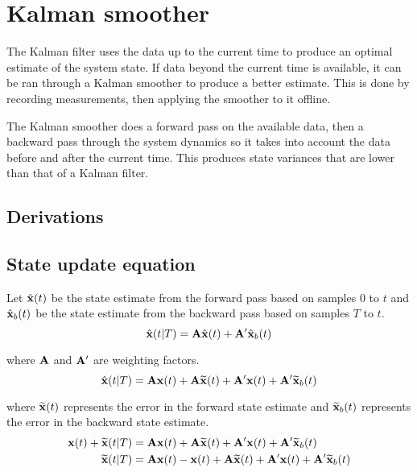 \section{Kalman smoother}

The Kalman filter uses the data up to the current time to produce an optimal
estimate of the system \gls{state}. If data beyond the current time is
available, it can be ran through a Kalman smoother to produce a better estimate.
This is done by recording measurements, then applying the smoother to it
offline.

The Kalman smoother does a forward pass on the available data, then a backward
pass through the system dynamics so it takes into account the data before and
after the current time. This produces \gls{state} variances that are lower than
that of a Kalman filter.

\subsection{Derivations}

\subsection{State update equation}

Let $\hat{\mathbf{x}}(t)$ be the state estimate from the forward pass based on
samples $0$ to $t$ and $\hat{\mathbf{x}}_b(t)$ be the state estimate from the
backward pass based on samples $T$ to $t$.
\begin{equation}
  \hat{\mathbf{x}}(t|T) = \mathbf{A}\hat{\mathbf{x}}(t) + \mathbf{A}'\hat{\mathbf{x}}_b(t)
    \label{eq:ks_xhat}
\end{equation}

where $\mathbf{A}$ and $\mathbf{A}'$ are weighting factors.
\begin{equation*}
  \hat{\mathbf{x}}(t|T) = \mathbf{A}\mathbf{x}(t) + \mathbf{A}\widetilde{\mathbf{x}}(t) +
    \mathbf{A}'\mathbf{x}(t) + \mathbf{A}'\widetilde{\mathbf{x}}_b(t)
\end{equation*}

where $\widetilde{\mathbf{x}}(t)$ represents the error in the forward state
estimate and $\widetilde{\mathbf{x}}_b(t)$ represents the error in the backward
state estimate.
\begin{align*}
  \mathbf{x}(t) + \widetilde{\mathbf{x}}(t|T) &= \mathbf{A}\mathbf{x}(t) +
    \mathbf{A}\widetilde{\mathbf{x}}(t) + \mathbf{A}'\mathbf{x}(t) +
    \mathbf{A}'\widetilde{\mathbf{x}}_b(t) \\
  \widetilde{\mathbf{x}}(t|T) &= \mathbf{A}\mathbf{x}(t) - \mathbf{x}(t) +
    \mathbf{A}\widetilde{\mathbf{x}}(t) + \mathbf{A}'\mathbf{x}(t) +
    \mathbf{A}'\widetilde{\mathbf{x}}_b(t)
\end{align*}

